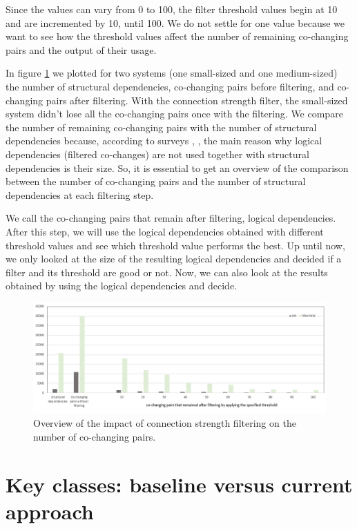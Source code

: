 \documentclass[runningheads]{comsis2}
\begin{document}
Since the values can vary from 0 to 100, the filter threshold values begin at 10 and are incremented by 10, until 100. We do not settle for one value because we want to see how the threshold values affect the number of remaining co-changing pairs and the output of their usage.

In figure \ref{fig:strength_overview} we plotted for two systems (one small-sized and one medium-sized) the number of structural dependencies, co-changing pairs before filtering, and co-changing pairs after filtering. With the connection strength filter, the small-sized system didn't lose all the co-changing pairs once with the filtering.
We compare the number of remaining co-changing pairs with the number of structural dependencies because, according to surveys \cite{Shtern:2012:CMS:2332427.2332428}, \cite{sar}, the main reason why logical dependencies (filtered co-changes) are not used together with structural dependencies is their size. So, it is essential to get an overview of the comparison between the number of co-changing pairs and the number of structural dependencies at each filtering step.

We call the co-changing pairs that remain after filtering, logical dependencies. 
After this step, we will use the logical dependencies obtained with different threshold values and see which threshold value performs the best. Up until now, we only looked at the size of the resulting logical dependencies and decided if a filter and its threshold are good or not. Now, we can also look at the results obtained by using the logical dependencies and decide.

\begin{figure}
\centering
\includegraphics[width=\textwidth]{strength_overview.PNG}
\caption{Overview of the impact of connection strength filtering on the number of co-changing pairs. }
\label{fig:strength_overview}
\centering
\end{figure}

\section{Key classes: baseline versus current approach}
\label{sec:baseline_approach}
\end{document}

